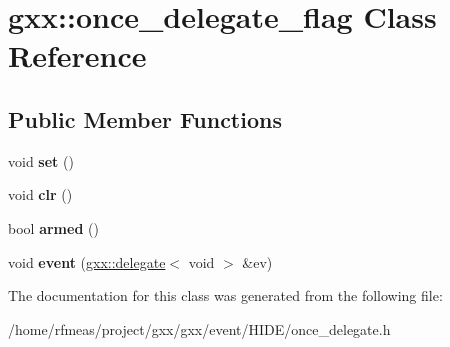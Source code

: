 \hypertarget{classgxx_1_1once__delegate__flag}{}\section{gxx\+:\+:once\+\_\+delegate\+\_\+flag Class Reference}
\label{classgxx_1_1once__delegate__flag}
\subsection*{Public Member Functions}
\begin{DoxyCompactItemize}
\item 
void {\bfseries set} ()\hypertarget{classgxx_1_1once__delegate__flag_a7ba1aaac2a538ce886d76570a2fd95f6}{}\label{classgxx_1_1once__delegate__flag_a7ba1aaac2a538ce886d76570a2fd95f6}

\item 
void {\bfseries clr} ()\hypertarget{classgxx_1_1once__delegate__flag_a7bb5173eff86eac4bf3a76b6592b293c}{}\label{classgxx_1_1once__delegate__flag_a7bb5173eff86eac4bf3a76b6592b293c}

\item 
bool {\bfseries armed} ()\hypertarget{classgxx_1_1once__delegate__flag_a32bf30660bc48074692ddf3cd2b45cc4}{}\label{classgxx_1_1once__delegate__flag_a32bf30660bc48074692ddf3cd2b45cc4}

\item 
void {\bfseries event} (\hyperlink{classgxx_1_1delegate}{gxx\+::delegate}$<$ void $>$ \&ev)\hypertarget{classgxx_1_1once__delegate__flag_a507ba6b9fecfaa197d44cb929bc68b6e}{}\label{classgxx_1_1once__delegate__flag_a507ba6b9fecfaa197d44cb929bc68b6e}

\end{DoxyCompactItemize}


The documentation for this class was generated from the following file\+:\begin{DoxyCompactItemize}
\item 
/home/rfmeas/project/gxx/gxx/event/\+H\+I\+D\+E/once\+\_\+delegate.\+h\end{DoxyCompactItemize}
